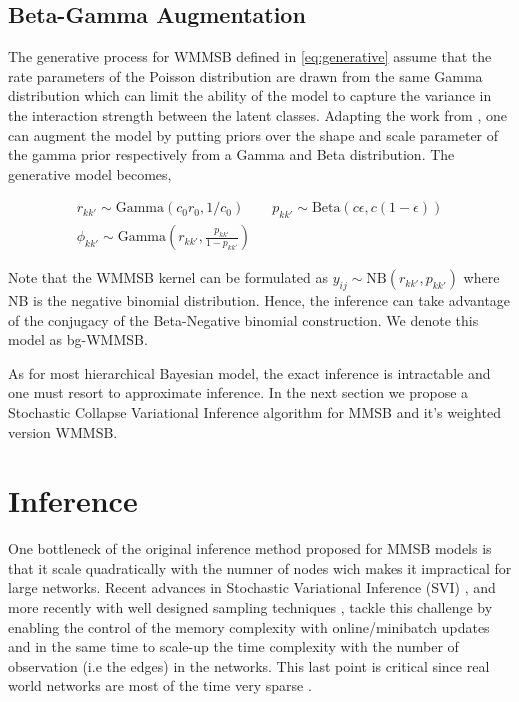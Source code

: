 \subsection{Beta-Gamma Augmentation}

The generative process for WMMSB defined in \eqref{eq:generative} assume that the rate parameters of the Poisson distribution are drawn from the same Gamma distribution which can limit the ability of the model to capture the variance in the interaction strength between the latent classes. Adapting the work from \cite{zhou2015negative} \cite{zhou2012beta}, one can augment the model by putting priors over the shape and scale parameter of the gamma prior respectively from a Gamma and Beta distribution. The generative model becomes,

\begin{gather*}
r_{kk'} \sim \textrm{Gamma}(c_0r_0, 1/c_0) \qquad p_{kk'} \sim \textrm{Beta}(c\epsilon, c(1-\epsilon)) \\
\phi_{kk'} \sim \textrm{Gamma}(r_{kk'}, \frac{p_{kk'}}{1-p_{kk'}})
\end{gather*}

Note that the WMMSB kernel can be formulated as $y_{ij} \sim \textrm{NB}(r_{kk'}, p_{kk'})$ where NB is the negative binomial distribution. Hence, the inference can take advantage of the conjugacy of the Beta-Negative binomial construction. We denote this model as bg-WMMSB.

As for most hierarchical Bayesian model, the exact inference is intractable and one must resort to approximate inference. In the next section we propose a Stochastic Collapse Variational Inference algorithm for MMSB and it's weighted version WMMSB.


\section{Inference}

One bottleneck of the original inference method proposed for MMSB models is that it scale quadratically with the numner of nodes wich makes it impractical for large networks. Recent advances in Stochastic Variational Inference (SVI) \cite{hoffman2013stochastic},  and more recently with well designed sampling techniques \cite{gopalan2013efficient}\cite{kim2013efficient}, tackle this challenge by enabling the control of the memory complexity with online/minibatch updates and in the same time to scale-up the time complexity with the number of observation (i.e the edges) in the networks. This last point is critical since real world networks are most of the time very sparse \cite{barabasi_burst}. 

